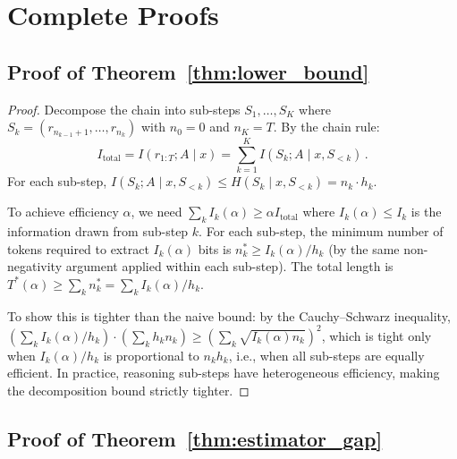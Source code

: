 \documentclass{article}
\newcommand{\Itotal}{I_{\mathrm{total}}}
\begin{document}



\appendix

\section{Complete Proofs}
\label{app:proofs}

\subsection{Proof of Theorem~\ref{thm:lower_bound}}

\begin{proof}
Decompose the chain into sub-steps $S_1, \ldots, S_K$ where $S_k = (r_{n_{k-1}+1}, \ldots, r_{n_k})$ with $n_0 = 0$ and $n_K = T$. By the chain rule:
\begin{equation}
    \Itotal = I(r_{1:T}; A \mid x) = \sum_{k=1}^K I(S_k; A \mid x, S_{<k})\,.
\end{equation}
For each sub-step, $I(S_k; A \mid x, S_{<k}) \leq H(S_k \mid x, S_{<k}) = n_k \cdot h_k$.

To achieve efficiency $\alpha$, we need $\sum_k I_k(\alpha) \geq \alpha \Itotal$ where $I_k(\alpha) \leq I_k$ is the information drawn from sub-step $k$. For each sub-step, the minimum number of tokens required to extract $I_k(\alpha)$ bits is $n_k^* \geq I_k(\alpha)/h_k$ (by the same non-negativity argument applied within each sub-step). The total length is $T^*(\alpha) \geq \sum_k n_k^* = \sum_k I_k(\alpha)/h_k$.

To show this is tighter than the naive bound: by the Cauchy--Schwarz inequality, $\left(\sum_k I_k(\alpha)/h_k\right) \cdot \left(\sum_k h_k n_k\right) \geq \left(\sum_k \sqrt{I_k(\alpha) n_k}\right)^2$, which is tight only when $I_k(\alpha)/h_k$ is proportional to $n_k h_k$, i.e., when all sub-steps are equally efficient. In practice, reasoning sub-steps have heterogeneous efficiency, making the decomposition bound strictly tighter.
\end{proof}

\subsection{Proof of Theorem~\ref{thm:estimator_gap}}
\end{document}
